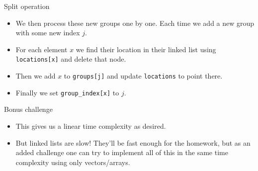 \documentclass{beamer}
\begin{document}
	\begin{frame}[plain]{Split operation}
		\begin{itemize}
			\item We then process these new groups one by one. Each time we add a new group with some new index $j$.
			\item For each element $x$ we find their location in their linked list using \texttt{locations[x]} and delete that node.
			\item Then we add $x$ to \texttt{groups[j]} and update \texttt{locations} to point there.
			\item Finally we set \texttt{group\_index[x]} to $j$.
		\end{itemize}
	\end{frame}
	
	\begin{frame}[plain]{Bonus challenge}
		\begin{itemize}
			\item This gives us a linear time complexity as desired.
			\item But linked lists are slow! They'll be fast enough for the homework, but as an added challenge one can try to implement all of this in the same time complexity using only vectors/arrays.
		\end{itemize}
	\end{frame}
	
\end{document}
